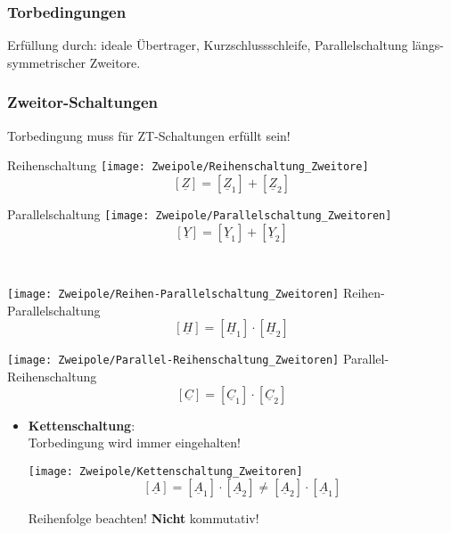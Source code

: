 \subsubsection{Torbedingungen}
\small
Erfüllung durch: ideale \"Ubertrager, Kurzschlussschleife, Parallelschaltung längs-symmetrischer Zweitore.
\normalsize
\subsubsection{Zweitor-Schaltungen}
Torbedingung muss für ZT-Schaltungen erfüllt sein!\\

\begin{minipage}{0.45\columnwidth}
		\centering Reihenschaltung
	\texttt{[image: Zweipole/Reihenschaltung\_Zweitore]}
	\[
	\left[ \underline{Z} \right] = \left[ \underline{Z}_1 \right] + \left[ \underline{Z}_2 \right]
	\]
\end{minipage}
\begin{minipage}{0.45\columnwidth}
	\centering Parallelschaltung
	\texttt{[image: Zweipole/Parallelschaltung\_Zweitoren]}
	\[
	\left[ \underline{Y} \right] = \left[ \underline{Y}_1 \right] + \left[ \underline{Y}_2 \right]
	\]
\end{minipage}  \\

\begin{minipage}{0.45\columnwidth}
			\texttt{[image: Zweipole/Reihen-Parallelschaltung\_Zweitoren]}
			 Reihen-Parallelschaltung
	\[
	\left[ \underline{H} \right] = \left[ \underline{H}_1 \right] \cdot \left[ \underline{H}_2 \right]
	\]
\end{minipage}
\begin{minipage}{0.45\columnwidth}
			\texttt{[image: Zweipole/Parallel-Reihenschaltung\_Zweitoren]}
			Parallel-Reihenschaltung
	\[
	\left[ \underline{C} \right] = \left[ \underline{C}_1 \right] \cdot \left[ \underline{C}_2 \right]
	\]
\end{minipage}

\begin{itemize}
	\item \textbf{Kettenschaltung}:\\
	Torbedingung wird immer eingehalten!
	\begin{center}
		\texttt{[image: Zweipole/Kettenschaltung\_Zweitoren]}
		\[
		\left[ \underline{A} \right] = \left[ \underline{A}_1 \right] \cdot \left[ \underline{A}_2 \right] \neq \left[ \underline{A}_2
		\right] \cdot \left[ \underline{A}_1 \right]
		\]
	\end{center}
	\normalsize Reihenfolge beachten! \textbf{Nicht} kommutativ!
\end{itemize}
